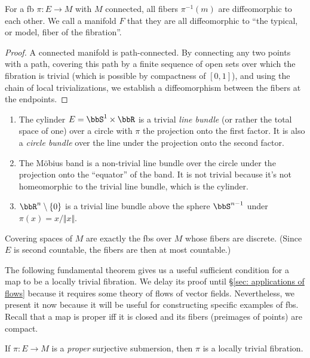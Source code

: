 \begin{prop}
    For a \gls{fb} $\pi:E\to M$ with $M$ connected, all fibers $\pi^{-1}(m)$ are diffeomorphic to each other. We call a manifold $F$ that they are all diffeomorphic to ``the typical, or model, fiber of the fibration''.
\end{prop}
\begin{proof}
    A connected manifold is path-connected. By connecting any two points with a path, covering this path by a finite sequence of open sets over which the fibration is trivial (which is possible by compactness of $[0,1]$), and using the chain of local trivializations, we establish a diffeomorphism between the fibers at the endpoints.
\end{proof}
\begin{example}
\begin{enumerate}
    \item The cylinder $E=\bbS^1\times\bbR $ is a trivial \emph{line bundle} (or rather the total space of one) over a circle with $\pi$ the projection onto the first factor. It is also a \emph{circle bundle} over the line under the projection onto the second factor.
    \item The M\"obius band is a non-trivial line bundle over the circle under the projection onto the ``equator'' of the band. It is not trivial because it's not homeomorphic to the trivial line bundle, which is the cylinder.
    \item $\bbR^n\setminus\{0\}$ is a trivial line bundle above the sphere $\bbS^{n-1}$ under $\pi(x)=x/\Vert x\Vert$.
\end{enumerate}
\end{example}


\begin{example}
    Covering spaces of $M$ are exactly the \glspl{fb} over $M$ whose fibers are discrete. (Since $E$ is second countable, the fibers are then at most countable.)
\end{example}

The following fundamental theorem gives us a useful sufficient condition for a map to be a locally trivial fibration. We delay its proof until \S\ref{sec: applications of flows} because it requires some theory of flows of vector fields. Nevertheless, we present it now because it will be useful for constructing specific examples of \glspl{fb}. Recall that a map is proper iff it is closed and its fibers (preimages of points) are compact.

\begin{thm}\label{thm Ehresmann}
    If $\pi:E\to M$ is a \emph{proper} surjective submersion, then $\pi$ is a locally trivial fibration.
\end{thm}

